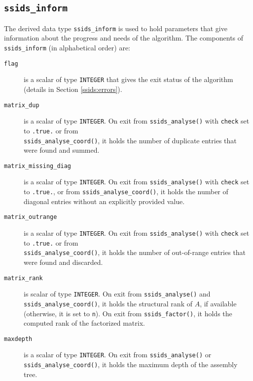 
\subsection{\texttt{ssids\_inform}}
\label{ssids:type:inform}
The derived data type {\tt ssids\_inform}
is used to hold parameters that give information about the progress and needs
of the algorithm. The components of {\tt ssids\_inform}
(in alphabetical order) are:

\begin{description}

\item[\texttt{flag}] is a scalar of type  {\tt INTEGER}
that gives the exit status of the algorithm (details in Section \ref{ssids:errors}).

\item[\texttt{matrix\_dup}] is a scalar  of type  {\tt INTEGER}.
On exit from {\tt ssids\_analyse()}
with {\tt check} set to {\tt .true.} or from \\
{\tt ssids\_analyse\_coord()}, it holds the
number of duplicate entries that were found and summed.

\item[\texttt{matrix\_missing\_diag}] is a scalar of type {\tt INTEGER}.
On exit from {\tt ssids\_analyse()} with {\tt check} set to {\tt .true.},
or from {\tt ssids\_analyse\_coord()}, it holds the number of diagonal
entries without an explicitly provided value.

\item[\texttt{matrix\_outrange}] is a scalar  of type  {\tt INTEGER}.
On exit from {\tt ssids\_analyse()}
with {\tt check} set to {\tt .true.} or from \\
{\tt ssids\_analyse\_coord()}, it holds the
number of out-of-range entries that were   found and discarded.

\item[\texttt{matrix\_rank}] is scalar of type  {\tt INTEGER}. On exit from
{\tt ssids\_analyse()} and {\tt ssids\_analyse\_coord()}, it holds
the structural rank of $A$, if available (otherwise, it is set to {\tt n}).
On exit from
{\tt ssids\_factor()}, it holds the computed rank of
the factorized matrix.

\item[\texttt{maxdepth}] is a scalar of type  {\tt INTEGER}. On exit from
{\tt ssids\_analyse()} or {\tt ssids\_analyse\_coord()}, it holds the maximum depth of the assembly tree.


\end{description}
